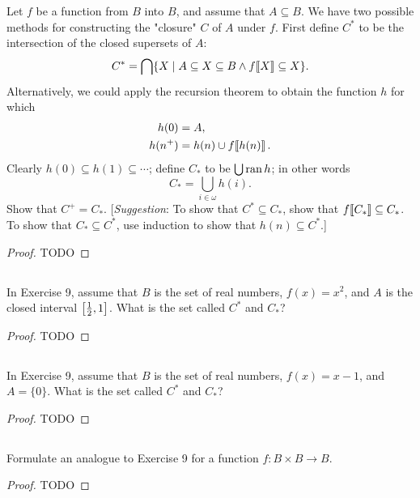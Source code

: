 \documentclass{report}
\begin{document}
Let $f$ be a function from $B$ into $B$, and assume that $A \subseteq B$.
We have two possible methods for constructing the "closure" $C$ of $A$ under
  $f$.
First define $C^*$ to be the intersection of the closed supersets of $A$:
  $$C^* = \bigcap\{X \mid
    A \subseteq X \subseteq B \land f\!\left\llbracket X\right\rrbracket \subseteq X\}.$$
Alternatively, we could apply the recursion theorem to obtain the function $h$
  for which
  \begin{align*}
    h(0) & = A, \\
    h(n^+) & = h(n) \cup f\!\left\llbracket h(n)\right\rrbracket.
  \end{align*}
Clearly $h(0) \subseteq h(1) \subseteq \cdots$; define $C_*$ to be
  $\bigcup\mathop{\text{ran}}{h}$; in other words $$C_* = \bigcup_{i \in \omega} h(i).$$
Show that $C^+ = C_*$.
[\textit{Suggestion}:
To show that $C^* \subseteq C_*$, show that $f\!\left\llbracket C_*\right\rrbracket \subseteq C_*$.
To show that $C_* \subseteq C^*$, use induction to show that
  $h(n) \subseteq C^*$.]

\begin{proof}

  TODO

\end{proof}

\subsection{}%

In Exercise 9, assume that $B$ is the set of real numbers, $f(x) = x^2$, and $A$
  is the closed interval $\left[\frac{1}{2}, 1\right]$.
What is the set called $C^*$ and $C_*$?

\begin{proof}

  TODO

\end{proof}

\subsection{}%

In Exercise 9, assume that $B$ is the set of real numbers, $f(x) = x - 1$, and
  $A = \{0\}$.
What is the set called $C^*$ and $C_*$?

\begin{proof}

  TODO

\end{proof}

\subsection{}%

Formulate an analogue to Exercise 9 for a function
  $f \colon B \times B \rightarrow B$.

\begin{proof}

  TODO

\end{proof}
\end{document}
